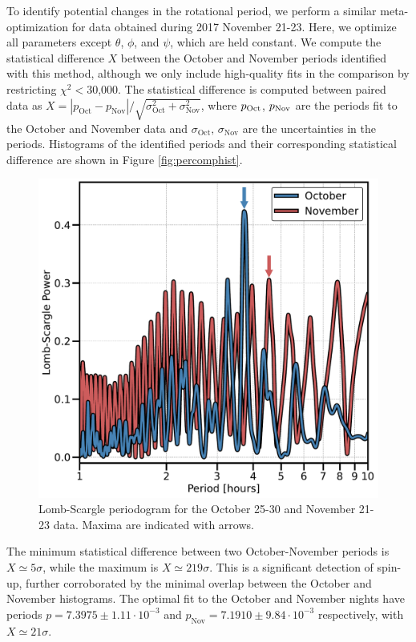\documentclass[twocolumn,doublespacing]{aastex631}
\begin{document}
To identify potential changes in the rotational period, we perform a similar meta-optimization for data obtained during 2017 November 21-23. Here, we optimize all parameters except $\theta$, $\phi$, and $\psi$, which are held constant. We compute the statistical difference $X$ between the October and November periods identified with this method, although we only include high-quality fits in the comparison by restricting $\chi^2<$30,000. The statistical difference is computed between paired data as $X=|p_\text{Oct}-p_\text{Nov}|/\sqrt{\sigma_\text{Oct}^2+\sigma_\text{Nov}^2}$, where $p_{\rm Oct}$, $p_{\rm Nov}$ are the periods fit to the October and November data and $\sigma_\text{Oct},\,\sigma_\text{Nov}$ are the uncertainties in the periods. Histograms of the identified periods and their corresponding statistical difference are shown in Figure \ref{fig:percomphist}. 

\begin{figure}
\centering
    \includegraphics[width=\linewidth,angle=0]{lomb_scargle_power.pdf}
    \caption{Lomb-Scargle periodogram for the October 25-30 and November 21-23 data. Maxima are indicated with arrows.}
    \label{fig:lombscargle}
\end{figure}

The minimum statistical difference between two October-November periods is $X\simeq5\sigma$, while the maximum is $X\simeq219\sigma$. This is a significant detection of spin-up, further corroborated by the minimal overlap between the October and November histograms. The optimal fit to the October and November nights have periods $p=7.3975\pm1.11\cdot10^{-3}$ and $p_\text{Nov}=7.1910\pm9.84\cdot10^{-3}$ respectively, with $X\simeq21\sigma$. 
\end{document}
